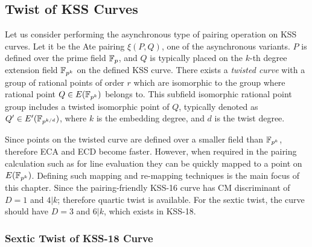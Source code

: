 \subsection{Twist of KSS Curves}
Let us consider performing the asynchronous type of pairing operation on KSS curves.  Let it be the Ate pairing $\xi(P, Q)$, one of the asynchronous variants. $P$  is defined over the prime field $\mathbb{F}_p$, and  $Q$ is typically placed on the $k$-th degree extension field $\mathbb{F}_{p^k}$ on the defined KSS curve. There exists a \textit{twisted curve} with a group of rational points of order $r$ which are isomorphic to the group where rational point $Q \in  E(\mathbb{F}_{p^k})$  belongs to. This subfield isomorphic rational point group includes a twisted isomorphic point of $Q$, typically denoted as $Q' \in E'(\mathbb{F}_{p^{k/d}})$, where $k$ is the embedding degree, and $d$ is the twist degree.  

Since points on the twisted curve are defined over a smaller field than $\mathbb{F}_{p^k}$, therefore ECA and ECD become faster. 
However, when required in the pairing calculation such as for line evaluation they can be quickly mapped to a point on $E(\mathbb{F}_{p^k} )$. 
Defining such mapping and re-mapping techniques is the main focus of this chapter. Since the pairing-friendly KSS-16 \cite{EPRINT:KacSchSco07} curve has CM discriminant of $D = 1$ and $4|k$; therefore quartic twist is available. For the sextic twist, the curve should have $D = 3$ and $6|k$, which exists in KSS-18.

\subsubsection{Sextic Twist of KSS-18 Curve}

